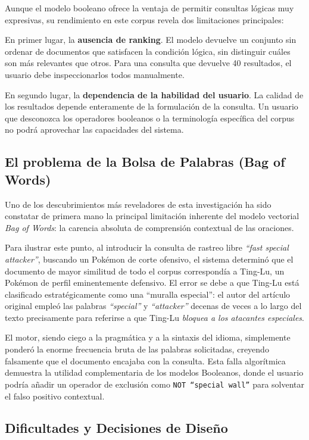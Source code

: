 \documentclass[conference,a4paper]{IEEEtran}
\begin{document}
Aunque el modelo booleano ofrece la ventaja de permitir consultas lógicas muy expresivas, su rendimiento en este corpus revela dos limitaciones principales:

En primer lugar, la \textbf{ausencia de ranking}. El modelo devuelve un conjunto sin ordenar de documentos que satisfacen la condición lógica, sin distinguir cuáles son más relevantes que otros. Para una consulta que devuelve 40 resultados, el usuario debe inspeccionarlos todos manualmente.

En segundo lugar, la \textbf{dependencia de la habilidad del usuario}. La calidad de los resultados depende enteramente de la formulación de la consulta. Un usuario que desconozca los operadores booleanos o la terminología específica del corpus no podrá aprovechar las capacidades del sistema.

\subsection{El problema de la Bolsa de Palabras (Bag of Words)}

Uno de los descubrimientos más reveladores de esta investigación ha sido constatar de primera mano la principal limitación inherente del modelo vectorial \emph{Bag of Words}: la carencia absoluta de comprensión contextual de las oraciones.

Para ilustrar este punto, al introducir la consulta de rastreo libre \emph{``fast special attacker''}, buscando un Pokémon de corte ofensivo, el sistema determinó que el documento de mayor similitud de todo el corpus correspondía a Ting-Lu, un Pokémon de perfil eminentemente defensivo. El error se debe a que Ting-Lu está clasificado estratégicamente como una ``muralla especial'': el autor del artículo original empleó las palabras \emph{``special''} y \emph{``attacker''} decenas de veces a lo largo del texto precisamente para referirse a que Ting-Lu \emph{bloquea a los atacantes especiales}. 

El motor, siendo ciego a la pragmática y a la sintaxis del idioma, simplemente ponderó la enorme frecuencia bruta de las palabras solicitadas, creyendo falsamente que el documento encajaba con la consulta. Esta falla algorítmica demuestra la utilidad complementaria de los modelos Booleanos, donde el usuario podría añadir un operador de exclusión como \texttt{NOT ``special wall''} para solventar el falso positivo contextual.

\subsection{Dificultades y Decisiones de Diseño}
\end{document}
